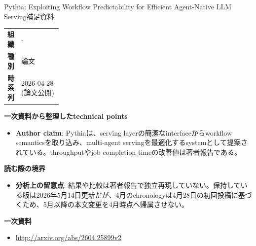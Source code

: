 \begin{technicalnote}{Pythia: Exploiting Workflow Predictability for Efficient Agent-Native LLM Serving}{補足資料}
\begingroup
\begin{tabularx}{\linewidth}{@{}>{\bfseries}p{0.22\linewidth}X@{}}
組織 & - \\
種別 & 論文 \\
時系列 & 2026-04-28 (論文公開) \\
\end{tabularx}
\smallskip
{\bfseries 一次資料から整理したtechnical points}
\begin{itemize}[leftmargin=1.5em,itemsep=0.35em]
\item \textbf{Author claim}: Pythiaは、serving layerの簡潔なinterfaceからworkflow semanticsを取り込み、multi-agent servingを最適化するsystemとして提案されている。throughputやjob completion timeの改善値は著者報告である。
\end{itemize}
\begin{minipage}{\linewidth}
{\bfseries 読む際の境界}
\begin{itemize}[leftmargin=1.5em,itemsep=0.35em]
\item \textbf{分析上の留意点}: 結果や比較は著者報告で独立再現していない。保持している版は2026年5月14日更新だが、4月のchronologyは4月28日の初回投稿に基づくため、5月以降の本文変更を4月時点へ帰属させない。
\end{itemize}
\begin{samepage}
{\bfseries 一次資料}
\begingroup\sloppy
\begin{itemize}[leftmargin=1.5em,itemsep=0.25em]
\item {\scriptsize\url{http://arxiv.org/abs/2604.25899v2}}
\end{itemize}
\endgroup
\end{samepage}
\end{minipage}
\endgroup
\end{technicalnote}
\medskip


